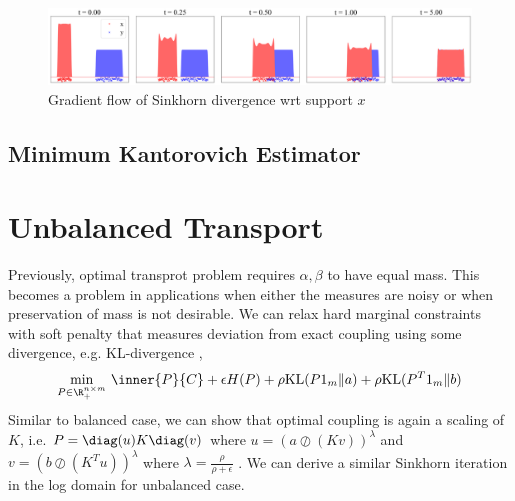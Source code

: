 \documentclass[11pt]{article}
\begin{document}
\begin{center} 
\begin{figure}[h!]
    \includegraphics[width=\textwidth]{assets/plt_gradientflow1d} 
    \caption{Gradient flow of Sinkhorn divergence wrt support $x$}
    \label{fig:plt_gradientflow1d}
\end{figure}
\end{center} 


\subsection{Minimum Kantorovich Estimator}

 

\section{Unbalanced Transport}

Previously, optimal transprot problem requires $\alpha,\beta$ to have equal mass. This becomes a problem in applications when either the measures are noisy or when preservation of mass is not desirable. We can relax hard marginal constraints with soft penalty that measures deviation from exact coupling using some divergence, e.g. KL-divergence \cite{chizatScalingAlgorithmsUnbalanced2017},
\begin{align}
    \min_{P\in\R^{n\times m}_+}\, 
        \inner{P}{C} + \epsilon H(P) + \rho \text{KL}(P1_m \Vert a) + \rho \text{KL}(P^T 1_m \Vert b)
\end{align}
Similar to balanced case, we can show that optimal coupling is again a scaling of $K$, i.e. $P = \diag(u) K \diag(v)$ where $u = (a \oslash (Kv))^{\lambda}$ and $v = (b \oslash (K^T u))^{\lambda}$ where $\lambda = \frac{\rho}{\rho + \epsilon}$ \cite{frognerLearningWassersteinLoss2015}. We can derive a similar Sinkhorn iteration in the log domain for unbalanced case.








\newpage
\printbibliography 
\end{document}
